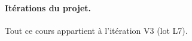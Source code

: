 \documentclass[11pt,a4paper]{report}
\begin{document}
\paragraph{Itérations du projet.} Tout ce cours appartient à l'itération V3 (lot L7).
\legendeiterations

\tableofcontents
\cleardoublepage
{}











\appendix

\end{document}
